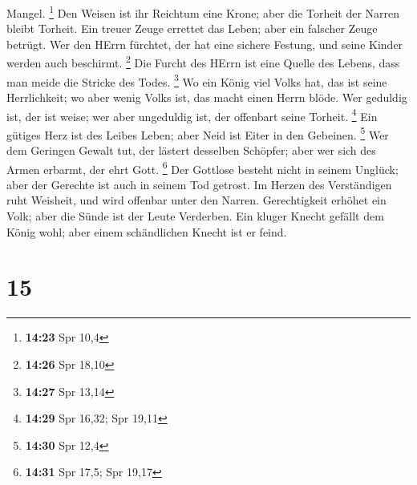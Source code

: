 Mangel. \footnote{\textbf{14:23} Spr 10,4}  Den Weisen
ist ihr Reichtum eine Krone; aber die Torheit der Narren bleibt Torheit.
 Ein treuer Zeuge errettet das Leben; aber ein falscher
Zeuge betrügt.  Wer den HErrn fürchtet, der hat eine
sichere Festung, und seine Kinder werden auch beschirmt. \footnote{\textbf{14:26}
  Spr 18,10}  Die Furcht des HErrn ist eine Quelle des
Lebens, dass man meide die Stricke des Todes. \footnote{\textbf{14:27}
  Spr 13,14}  Wo ein König viel Volks hat, das ist seine
Herrlichkeit; wo aber wenig Volks ist, das macht einen Herrn blöde.
 Wer geduldig ist, der ist weise; wer aber ungeduldig
ist, der offenbart seine Torheit. \footnote{\textbf{14:29} Spr 16,32;
  Spr 19,11}  Ein gütiges Herz ist des Leibes Leben; aber
Neid ist Eiter in den Gebeinen. \footnote{\textbf{14:30} Spr 12,4}
 Wer dem Geringen Gewalt tut, der lästert desselben
Schöpfer; aber wer sich des Armen erbarmt, der ehrt Gott. \footnote{\textbf{14:31}
  Spr 17,5; Spr 19,17}  Der Gottlose besteht nicht in
seinem Unglück; aber der Gerechte ist auch in seinem Tod getrost.
 Im Herzen des Verständigen ruht Weisheit, und wird
offenbar unter den Narren.  Gerechtigkeit erhöhet ein
Volk; aber die Sünde ist der Leute Verderben.  Ein kluger
Knecht gefällt dem König wohl; aber einem schändlichen Knecht ist er
feind.

\hypertarget{section-14}{%
\section{15}\label{section-14}}

